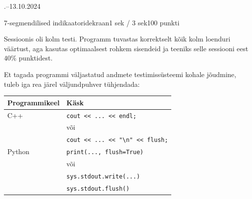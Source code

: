 \documentclass[a4paper,11pt]{article}
\begin{document}
\begin{ol}{\eio}{.--13.10.2024}{\yle}{}
\begin{yl}{6}{7-segmendilised indikaatorid}{ekraan}{1 sek / 3 sek}{100 punkti}
\renewcommand{\sisplk}{Masin}
\renewcommand{\valplk}{Programm}      
\nde[0]{3cm}{3cm}

Sessioonis oli kolm testi. Programm tuvastas korrektselt kõik kolm loenduri väärtust, aga kasutas optimaalsest rohkem sisendeid  ja teeniks selle sessiooni eest $40\%$ punktidest.

\mrk Et tagada programmi väljastatud andmete testimissüsteemi kohale jõudmine, tuleb iga rea järel väljundpuhver tühjendada:

\begin{tabular}{l|l}
Programmikeel & Käsk \\
\hline
C++ & \verb'cout << ... << endl;' \\
    & või \\
    & \verb'cout << ... << "\n" << flush;' \\
\hline
Python & \verb'print(..., flush=True)' \\
       & või \\
       & \verb'sys.stdout.write(...)' \\
       & \verb'sys.stdout.flush()' \\
\hline
\end{tabular}

\end{yl}
\end{ol}
\end{document}

